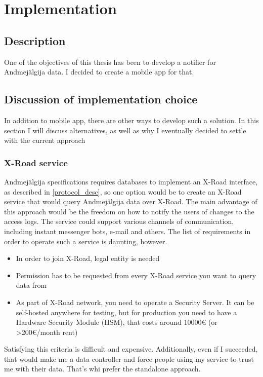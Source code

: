 \section{Implementation}

\subsection{Description}

One of the objectives of this thesis has been to develop a notifier for Andmejälgija data. I decided to create a mobile app for that.

\subsection{Discussion of implementation choice}
In addition to mobile app, there are other ways to develop such a solution. In this section I will discuss alternatives, as well as why I eventually decided to settle with the current approach

\subsubsection{X-Road service}
Andmejälgija specifications requires databases to implement an X-Road interface, as described in \ref{protocol_desc}, so one option would be to create an X-Road service that would query Andmejälgija data over X-Road. The main advantage of this approach would be the freedom on how to notify the users of changes to the access logs. The service could support various channels of communication, including instant messenger bots, e-mail and others. The list of requirements in order to operate such a service is daunting, however. 

\begin{itemize}
    \item {In order to join X-Road, legal entity is needed}
    \item {Permission has to be requested from every X-Road service you want to query data from}
    \item {As part of X-Road network, you need to operate a Security Server. It can be self-hosted anywhere for testing, but for production you need to have a Hardware Security Module (HSM), that costs around 10000€ (or >200€/month rent)}
\end{itemize}

Satisfying this criteria is difficult and expensive. Additionally, even if I succeeded, that would make me a data controller and force people using my service to trust me with their data. That's whi prefer the standalone approach.

